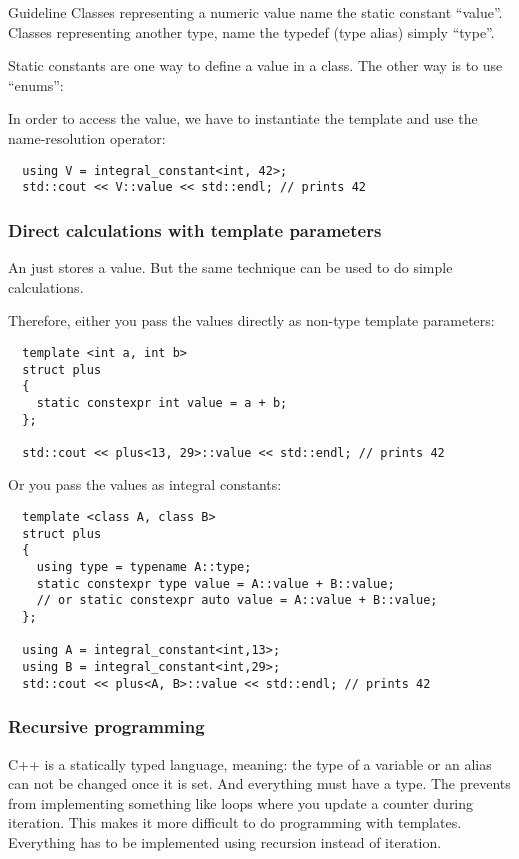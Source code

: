 \begin{guideline}{Guideline}
  Classes representing a numeric value name the static constant ``value''. Classes representing another type, name the typedef (type alias) simply ``type''.
\end{guideline}

\begin{rem}
Static  constants are one way to define a value in a class. The other way is to use ``enums'':
\end{rem}

In order to access the value, we have to instantiate the template and use the name-resolution operator:
\begin{verbatim}
  using V = integral_constant<int, 42>;
  std::cout << V::value << std::endl; // prints 42
\end{verbatim}


\subsubsection{Direct calculations with template parameters}
An  just stores a value. But the same technique can be used to do simple calculations.

Therefore, either you pass the values directly as non-type template parameters:
\begin{verbatim}
  template <int a, int b>
  struct plus
  {
    static constexpr int value = a + b;
  };

  std::cout << plus<13, 29>::value << std::endl; // prints 42
\end{verbatim}

Or you pass the values as integral constants:
\begin{verbatim}
  template <class A, class B>
  struct plus
  {
    using type = typename A::type;
    static constexpr type value = A::value + B::value;
    // or static constexpr auto value = A::value + B::value;
  };

  using A = integral_constant<int,13>;
  using B = integral_constant<int,29>;
  std::cout << plus<A, B>::value << std::endl; // prints 42
\end{verbatim}


\subsubsection{Recursive programming}
C++ is a statically typed language, meaning: the type of a variable or an alias can not be changed once it is set. And everything must
have a type. The prevents from implementing something like loops where you update a counter during iteration. This makes it more
difficult to do programming with templates. Everything has to be implemented using recursion instead of iteration.

